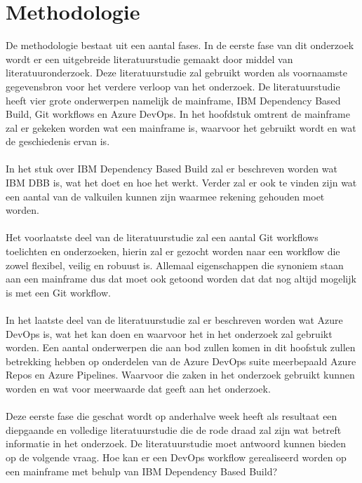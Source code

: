 \section{Methodologie}%
\label{sec:methodologie}

De methodologie bestaat uit een aantal fases.
In de eerste fase van dit onderzoek wordt er een uitgebreide literatuurstudie gemaakt door middel van literatuuronderzoek.
Deze literatuurstudie zal gebruikt worden als voornaamste gegevensbron voor het verdere verloop van het onderzoek.
De literatuurstudie heeft vier grote onderwerpen namelijk de mainframe, IBM Dependency Based Build, Git workflows en Azure DevOps.
In het hoofdstuk omtrent de mainframe zal er gekeken worden wat een mainframe is, waarvoor het gebruikt wordt en wat de geschiedenis ervan is.
\\ \\
In het stuk over IBM Dependency Based Build zal er beschreven worden wat IBM DBB is, wat het doet en hoe het werkt.
Verder zal er ook te vinden zijn wat een aantal van de valkuilen kunnen zijn waarmee rekening gehouden moet worden.
\\ \\
Het voorlaatste deel van de literatuurstudie zal een aantal Git workflows toelichten en onderzoeken, hierin zal er gezocht worden naar een workflow die zowel flexibel, veilig en robuust is.
Allemaal eigenschappen die synoniem staan aan een mainframe dus dat moet ook getoond worden dat dat nog altijd mogelijk is met een Git workflow.
\\ \\
In het laatste deel van de literatuurstudie zal er beschreven worden wat Azure DevOps is, wat het kan doen en waarvoor het in het onderzoek zal gebruikt worden.
Een aantal onderwerpen die aan bod zullen komen in dit hoofstuk zullen betrekking hebben op onderdelen van de Azure DevOps suite meerbepaald Azure Repos en Azure Pipelines.
Waarvoor die zaken in het onderzoek gebruikt kunnen worden en wat voor meerwaarde dat geeft aan het onderzoek.
\\ \\
Deze eerste fase die geschat wordt op anderhalve week heeft als resultaat een diepgaande en volledige literatuurstudie die de rode draad zal zijn wat betreft informatie in het onderzoek. De literatuurstudie moet antwoord kunnen bieden op de volgende vraag. Hoe kan er een DevOps workflow gerealiseerd worden op een mainframe met behulp van IBM Dependency Based Build?
